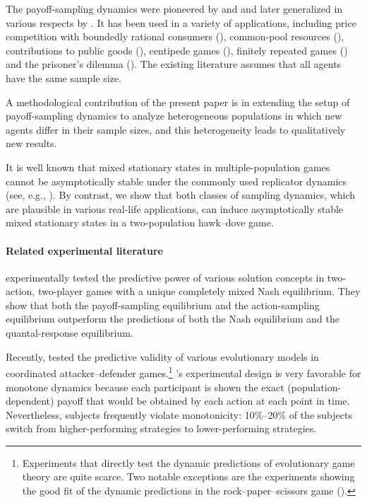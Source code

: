 \documentclass[12pt]{article}
\numberwithin{equation}{section}
\numberwithin{figure}{section}
\theoremstyle{definition}
\theoremstyle{plain}
\theoremstyle{plain}
\theoremstyle{plain}
\theoremstyle{remark}
\theoremstyle{plain}
\theoremstyle{plain}
\begin{document}
The payoff-sampling dynamics were pioneered by \cite{osborne1998games} and \cite{sethi2000stability} and later generalized in various respects by \cite{sandholm2020stability}. It has been used in a variety of applications, including price competition with boundedly rational consumers (\citealp{spiegler2006competition}), common-pool resources (\citealp{cardenas2015stable}), contributions to public goods (\citealp{mantilla2018efficiency}), centipede games (\citealp{sandholm2019best}), finitely repeated games (\citealp{Raj}) and the prisoner's dilemma (\citealp{arigapudi2020instability}).
The existing literature assumes that all agents have the same sample size. 

A methodological contribution of the present paper is in extending the setup of payoff-sampling dynamics to analyze heterogeneous populations in which new agents differ in their sample sizes, and this heterogeneity leads to 
qualitatively new 
results.

It is well known that mixed stationary states in  multiple-population games cannot be asymptotically stable under the commonly used replicator dynamics (see, e.g.,  \citealp[Theorem 9.1.6]{sandholm2010population}).
 By contrast, we show that both classes of sampling dynamics, which are plausible in various real-life applications, can induce asymptotically stable mixed stationary states in a two-population hawk--dove game.

\paragraph{Related experimental literature}
\cite{selten2008stationary} experimentally tested the predictive power of various solution concepts in two-action, two-player games with a unique completely mixed Nash equilibrium. They show that 
both the payoff-sampling equilibrium and the action-sampling equilibrium outperform the predictions of both the Nash equilibrium and the quantal-response equilibrium. 


Recently, \cite{stephenson2019coordination} tested the predictive validity of various evolutionary models in coordinated attacker–defender games.\footnote{Experiments that directly test the dynamic predictions of evolutionary game theory are quite scarce. Two notable exceptions are the experiments showing the good fit of the dynamic predictions in the rock--paper--scissors game (\citealp{cason2014cycles,hoffman2015experimental}).} \citeauthor{stephenson2019coordination}'s experimental design is very favorable for monotone dynamics because each participant is shown the exact (population-dependent) payoff that would be obtained by each action at each point in time. Nevertheless, subjects frequently violate monotonicity: 10\%--20\% of the subjects switch from higher-performing strategies to lower-performing strategies.
\end{document}
